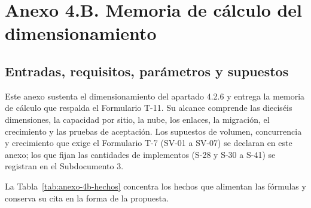 %

\chapter*{Anexo 4.B. Memoria de cálculo del dimensionamiento}

\begingroup
\renewcommand{\thesection}{4.B.\arabic{section}}
\renewcommand{\theHsection}{anexo4B.\arabic{section}}%
\setcounter{section}{0}

\section{Entradas, requisitos, parámetros y supuestos}
\label{sec:anexo-4b-entradas}

Este anexo sustenta el dimensionamiento del apartado 4.2.6 y entrega la memoria de cálculo que respalda el Formulario T-11. Su alcance comprende las dieciséis dimensiones, la capacidad por sitio, la nube, los enlaces, la migración, el crecimiento y las pruebas de aceptación. Los supuestos de volumen, concurrencia y crecimiento que exige el Formulario T-7 (SV-01 a SV-07) se declaran en este anexo; los que fijan las cantidades de implementos (S-28 y S-30 a S-41) se registran en el Subdocumento 3.

La Tabla~\ref{tab:anexo-4b-hechos} concentra los hechos que alimentan las fórmulas y conserva su cita en la forma de la propuesta.

